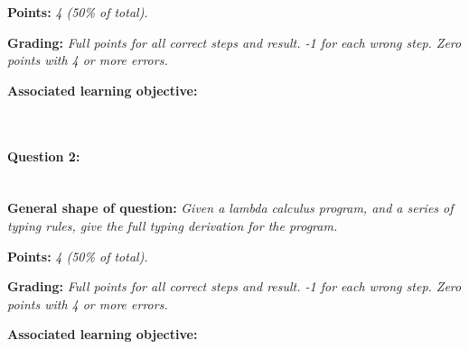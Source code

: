 \textbf{Points:} \textit{4 (50\% of total).}

\textbf{Grading:} \textit{Full points for all correct steps and result. -1 for each wrong step. Zero points with 4 or more errors.}

\textbf{Associated learning objective:} 

\ \\ 

\paragraph{Question 2: } \ \\

\textbf{General shape of question:} \textit{Given a lambda calculus program, and a series of typing rules, give the full typing derivation for the program.}

\begin{comment}
\textbf{Concrete example of question:} 

\lstset{numbers=left,basicstyle=\ttfamily\small}\lstset{language=[Sharp]C}


\textbf{Concrete example of answer:} \textit{}

\begin{lstlisting}
TODO
\end{lstlisting}
\end{comment}

\textbf{Points:} \textit{4 (50\% of total).}

\textbf{Grading:} \textit{Full points for all correct steps and result. -1 for each wrong step. Zero points with 4 or more errors.}

\textbf{Associated learning objective:} 

\ \\
